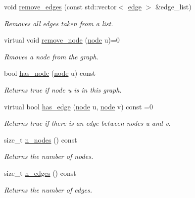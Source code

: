 \begin{DoxyCompactItemize}
void \hyperlink{classlgraph_1_1xxgraph_aef7c4bf62f3f4db362b2d3accb3b6d3d}{remove\+\_\+edges} (const std\+::vector$<$ \hyperlink{namespacelgraph_a76bd7d50719f03de7a85db259d80d572}{edge} $>$ \&edge\+\_\+list)
\begin{DoxyCompactList}\small\item\em Removes all edges taken from a list. \end{DoxyCompactList}\item 
virtual void \hyperlink{classlgraph_1_1xxgraph_a5b9e033f38a3ab34734be61aa9344c84}{remove\+\_\+node} (\hyperlink{namespacelgraph_a397169dd66adf725210a30fb7251773e}{node} u)=0
\begin{DoxyCompactList}\small\item\em Rmoves a node from the graph. \end{DoxyCompactList}\item 
\mbox{\label{classlgraph_1_1xxgraph_a24645831355480e05f8e7ba75a5348c8}} 
bool \hyperlink{classlgraph_1_1xxgraph_a24645831355480e05f8e7ba75a5348c8}{has\+\_\+node} (\hyperlink{namespacelgraph_a397169dd66adf725210a30fb7251773e}{node} u) const
\begin{DoxyCompactList}\small\item\em Returns true if node {\itshape u} is in this graph. \end{DoxyCompactList}\item 
virtual bool \hyperlink{classlgraph_1_1xxgraph_a4e36e9722df020df6ba1dc47b7d9d830}{has\+\_\+edge} (\hyperlink{namespacelgraph_a397169dd66adf725210a30fb7251773e}{node} u, \hyperlink{namespacelgraph_a397169dd66adf725210a30fb7251773e}{node} v) const =0
\begin{DoxyCompactList}\small\item\em Returns true if there is an edge between nodes {\itshape u} and {\itshape v}. \end{DoxyCompactList}\item 
size\+\_\+t \hyperlink{classlgraph_1_1xxgraph_a67f651617ada4053b569102b9a54cab0}{n\+\_\+nodes} () const
\begin{DoxyCompactList}\small\item\em Returns the number of nodes. \end{DoxyCompactList}\item 
size\+\_\+t \hyperlink{classlgraph_1_1xxgraph_af00bce8b07a42754601d1e3bebe2c1fa}{n\+\_\+edges} () const
\begin{DoxyCompactList}\small\item\em Returns the number of edges. \end{DoxyCompactList}\item 

\end{DoxyCompactItemize}
